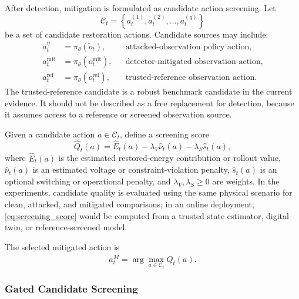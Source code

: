 After detection, mitigation is formulated as candidate action screening. Let
\begin{equation}
    \mathcal{C}_t
    =
    \left\{
        a_t^{(1)},a_t^{(2)},\ldots,a_t^{(q)}
    \right\}
    \label{eq:candidate_set}
\end{equation}
be a set of candidate restoration actions. Candidate sources may include:
\begin{align}
    a_t^{\eta} &= \pi_{\theta}(\tilde{o}_t),
    &&\text{attacked-observation policy action},\\
    a_t^{\mathrm{mit}} &= \pi_{\theta}(o_t^{\mathrm{mit}}),
    &&\text{detector-mitigated observation action},\\
    a_t^{\mathrm{ref}} &= \pi_{\theta}(o_t^{\mathrm{ref}}),
    &&\text{trusted-reference observation action}.
    \label{eq:candidate_sources}
\end{align}
The trusted-reference candidate is a robust benchmark candidate in the current evidence. It should not be described as a free replacement for detection, because it assumes access to a reference or screened observation source.

Given a candidate action $a \in \mathcal{C}_t$, define a screening score
\begin{equation}
    \widehat{Q}_t(a)
    =
    \widehat{E}_t(a)
    -
    \lambda_V \widehat{\nu}_t(a)
    -
    \lambda_S \widehat{s}_t(a),
    \label{eq:screening_score}
\end{equation}
where $\widehat{E}_t(a)$ is the estimated restored-energy contribution or rollout value, $\widehat{\nu}_t(a)$ is an estimated voltage or constraint-violation penalty, $\widehat{s}_t(a)$ is an optional switching or operational penalty, and $\lambda_V,\lambda_S \geq 0$ are weights. In the experiments, candidate quality is evaluated using the same physical scenario for clean, attacked, and mitigated comparisons; in an online deployment, \eqref{eq:screening_score} would be computed from a trusted state estimator, digital twin, or reference-screened model.

The selected mitigated action is
\begin{equation}
    a_t^{M}
    =
    \arg\max_{a \in \mathcal{C}_t}
    \widehat{Q}_t(a).
    \label{eq:mitigated_action}
\end{equation}

\subsubsection{Gated Candidate Screening}

